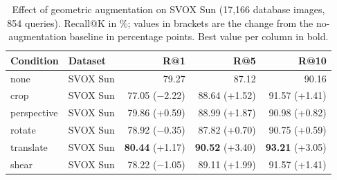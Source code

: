 \begin{table}[htbp]
\centering
\caption{Effect of geometric augmentation on SVOX Sun (17,166 database images, 854 queries). Recall@K in \%; values in brackets are the change from the no-augmentation baseline in percentage points. Best value per column in bold.}
\label{tab:geoaug_svox_sun}
\begin{tabular}{llrrr}
\toprule
Condition & Dataset & R@1 & R@5 & R@10 \\
\midrule
none & SVOX Sun & 79.27 & 87.12 & 90.16 \\
\midrule
crop & SVOX Sun & 77.05 {\scriptsize ($-$2.22)} & 88.64 {\scriptsize (+1.52)} & 91.57 {\scriptsize (+1.41)} \\
perspective & SVOX Sun & 79.86 {\scriptsize (+0.59)} & 88.99 {\scriptsize (+1.87)} & 90.98 {\scriptsize (+0.82)} \\
rotate & SVOX Sun & 78.92 {\scriptsize ($-$0.35)} & 87.82 {\scriptsize (+0.70)} & 90.75 {\scriptsize (+0.59)} \\
translate & SVOX Sun & \textbf{80.44} {\scriptsize (+1.17)} & \textbf{90.52} {\scriptsize (+3.40)} & \textbf{93.21} {\scriptsize (+3.05)} \\
shear & SVOX Sun & 78.22 {\scriptsize ($-$1.05)} & 89.11 {\scriptsize (+1.99)} & 91.57 {\scriptsize (+1.41)} \\
\bottomrule
\end{tabular}
\end{table}
